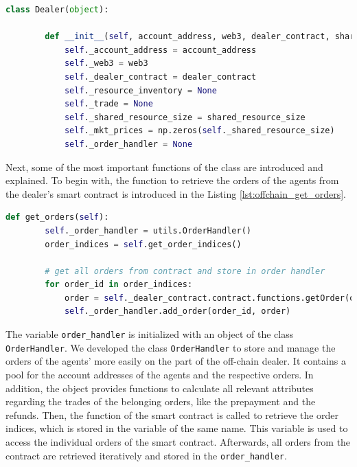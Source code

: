 \begin{lstlisting}[float=htbp, label=lst:offchain_class_attributes, caption=Overview of the off-chain dealer's class attributes, language=Python]
    class Dealer(object):

        def __init__(self, account_address, web3, dealer_contract, shared_resource_size):
            self._account_address = account_address
            self._web3 = web3
            self._dealer_contract = dealer_contract
            self._resource_inventory = None
            self._trade = None
            self._shared_resource_size = shared_resource_size
            self._mkt_prices = np.zeros(self._shared_resource_size)
            self._order_handler = None
\end{lstlisting}

Next, some of the most important functions of the class are introduced and explained.
To begin with, the function to retrieve the orders of the agents from the dealer's 
smart contract is introduced in the Listing \ref{lst:offchain_get_orders}.

\begin{lstlisting}[float=htbp, label=lst:offchain_get_orders, caption=Retrievement of orders, language=Python]
    def get_orders(self):
        self._order_handler = utils.OrderHandler()
        order_indices = self.get_order_indices()

        # get all orders from contract and store in order handler
        for order_id in order_indices:
            order = self._dealer_contract.contract.functions.getOrder(order_id).call()
            self._order_handler.add_order(order_id, order)
\end{lstlisting}

The variable \verb|order_handler| is initialized with an object of the class \verb|OrderHandler|.
We developed the class \verb|OrderHandler| to store and manage the orders of the agents' more easily
on the part of the off-chain dealer.
It contains a pool for the account addresses of the agents and the 
respective orders. In addition, the object provides functions to 
calculate all relevant attributes regarding the trades of the belonging orders, 
like the prepayment and the refunds.
Then, the function of the smart contract is called to retrieve the order indices,
which is stored in the variable of the same name. This variable is used to 
access the individual orders of the smart contract.
Afterwards, all orders from the contract are retrieved iteratively and stored in the \verb|order_handler|.

